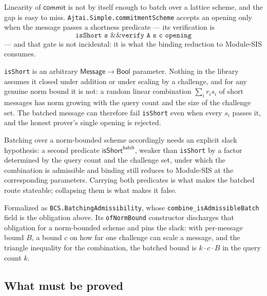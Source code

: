 \begin{remark}
    \label{rem:bcs_shortness}
    Linearity of $\mathsf{commit}$ is not by itself enough to batch over a lattice scheme, and the
    gap is easy to miss. \texttt{Ajtai.Simple.\allowbreak commitmentScheme} accepts an opening
    only when the message passes a shortness predicate --- its verification is
    \[
        \texttt{isShort s \&\& verify A s c opening}
    \]
    --- and that gate is not incidental: it is what the binding reduction to Module-SIS consumes.

    \texttt{isShort} is an arbitrary $\mathsf{Message} \to \mathsf{Bool}$ parameter. Nothing in the
    library assumes it closed under addition or under scaling by a challenge, and for any genuine
    norm bound it is not: a random linear combination $\sum_i r_i s_i$ of short messages has norm
    growing with the query count and the size of the challenge set. The batched message can
    therefore fail \texttt{isShort} even when every $s_i$ passes it, and the honest prover's single
    opening is rejected.

    Batching over a norm-bounded scheme accordingly needs an explicit slack hypothesis: a second
    predicate $\mathsf{isShort}^{\mathsf{batch}}$, weaker than \texttt{isShort} by a factor
    determined by the query count and the challenge set, under which the combination is admissible
    and binding still reduces to Module-SIS at the corresponding parameters. Carrying both
    predicates is what makes the batched route stateable; collapsing them is what makes it false.

    Formalized as \texttt{BCS.BatchingAdmissibility}, whose
    \texttt{combine\_isAdmissibleBatch} field is the obligation above. Its
    \texttt{ofNormBound} constructor discharges that obligation for a norm-bounded scheme
    and pins the slack: with per-message bound $B$, a bound $c$ on how far one challenge
    can scale a message, and the triangle inequality for the combination, the batched
    bound is $k \cdot c \cdot B$ in the query count $k$.
\end{remark}

\subsection{What must be proved}\label{sec:bcs_security}


